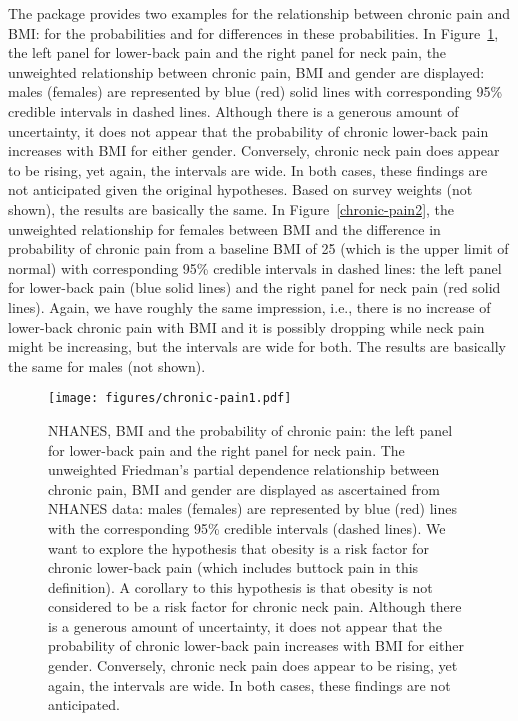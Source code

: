 \documentclass[article]{jss}
\begin{document}
The  package provides two examples for the relationship
between chronic pain and BMI:  for the probabilities and
 for differences in these
probabilities.  In Figure~\ref{chronic-pain1}, the left panel for
lower-back pain and the right panel for neck pain, the
unweighted relationship between chronic pain, BMI and gender are
displayed: males (females) are represented by blue (red) solid lines
with corresponding 95\% credible intervals in dashed lines.  Although
there is a generous amount of uncertainty, it does not appear that the
probability of chronic lower-back pain increases with BMI for either
gender.  Conversely, chronic neck pain does appear to be rising, yet
again, the intervals are wide.  In both cases, these findings are not
anticipated given the original hypotheses.  Based on survey weights
(not shown), the results are basically the same.  In
Figure~\ref{chronic-pain2}, the unweighted relationship for females
between BMI and the difference in probability of chronic pain from a
baseline BMI of 25 (which is the upper limit of normal) with
corresponding 95\% credible intervals in dashed lines: the left panel
for lower-back pain (blue solid lines) and the right panel for
neck pain (red solid lines). Again, we have roughly the same
impression, i.e., there is no increase of lower-back chronic
pain with BMI and it is possibly dropping while neck pain might be
increasing, but the intervals are wide for both.  The results are
basically the same for males (not shown).
\begin{figure}%
\begin{center}
\texttt{[image: figures/chronic-pain1.pdf]}
\end{center}
\caption{\label{chronic-pain1}NHANES, BMI and the probability of
  chronic pain: the left panel for lower-back pain and the
  right panel for neck pain.  The unweighted Friedman's partial
  dependence relationship between chronic pain, BMI and gender are
  displayed as ascertained from NHANES data: males (females) are
  represented by blue (red) lines with the corresponding 95\% credible
  intervals (dashed lines).  We want to explore the hypothesis that
  obesity is a risk factor for chronic lower-back pain (which includes
  buttock pain in this definition).  A corollary to this hypothesis is
  that obesity is not considered to be a risk factor for chronic neck
  pain.  Although there is a generous amount of uncertainty, it does
  not appear that the probability of chronic lower-back pain increases
  with BMI for either gender.  Conversely, chronic neck pain does
  appear to be rising, yet again, the intervals are wide.  In both
  cases, these findings are not anticipated.  }
\end{figure}
\end{document}

